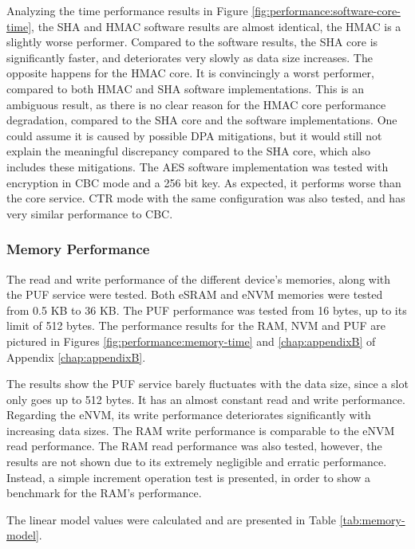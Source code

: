 Analyzing the time performance results in Figure \ref{fig:performance:software-core-time}, the SHA and HMAC software results are almost identical, the HMAC is a slightly worse performer. Compared to the software results, the SHA core is significantly faster, and deteriorates very slowly as data size increases. The opposite happens for the HMAC core. It is convincingly a worst performer, compared to both HMAC and SHA software implementations. 
This is an ambiguous result, as there is no clear reason for the HMAC core performance degradation, compared to the SHA core and the software implementations. One could assume it is caused by possible DPA mitigations, but it would still not explain the meaningful discrepancy compared to the SHA core, which also includes these mitigations.
The AES software implementation was tested with encryption in CBC mode and a 256 bit key. As expected, it performs worse than the core service. CTR mode with the same configuration was also tested, and has very similar performance to CBC.

\subsubsection*{Memory Performance}\label{chap:evaluation:services:memory}

The read and write performance of the different device's memories, along with the PUF service were tested. Both eSRAM and eNVM memories were tested from 0.5 KB to 36 KB. The PUF performance was tested from 16 bytes, up to its limit of 512 bytes.
The performance results for the RAM, NVM and PUF are pictured in Figures \ref{fig:performance:memory-time} and \ref{chap:appendixB} of Appendix \ref{chap:appendixB}.

The results show the PUF service barely fluctuates with the data size, since a slot only goes up to 512 bytes. It has an almost constant read and write performance.
Regarding the eNVM, its write performance deteriorates significantly with increasing data sizes.
The RAM write performance is comparable to the eNVM read performance. The RAM read performance was also tested, however, the results are not shown due to its extremely negligible and erratic performance. Instead, a simple increment operation test is presented, in order to show a benchmark for the RAM's performance.

The linear model values were calculated and are presented in Table \ref{tab:memory-model}.



